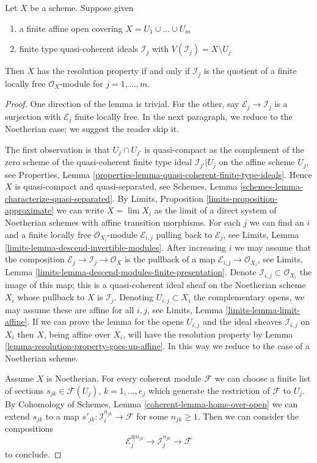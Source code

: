 \begin{lemma}
\label{lemma-resolution-property-finite-number}
Let $X$ be a scheme. Suppose given
\begin{enumerate}
\item a finite affine open covering $X = U_1 \cup \ldots \cup U_m$
\item finite type quasi-coherent ideals $\mathcal{I}_j$
with $V(\mathcal{I}_j) = X \setminus U_j$
\end{enumerate}
Then $X$ has the resolution property if and only if $\mathcal{I}_j$
is the quotient of a finite locally free $\mathcal{O}_X$-module
for $j = 1, \ldots, m$.
\end{lemma}

\begin{proof}
One direction of the lemma is trivial. For the other, 
say $\mathcal{E}_j \to \mathcal{I}_j$ is a surjection with
$\mathcal{E}_j$ finite locally free. In the next paragraph, we
reduce to the Noetherian case; we suggest the reader skip it.

\medskip\noindent
The first observation is that $U_j \cap U_{j'}$ is quasi-compact
as the complement of the zero scheme of the quasi-coherent finite type ideal
$\mathcal{I}_{j'}|{U_j}$ on the affine scheme $U_j$, see
Properties, Lemma \ref{properties-lemma-quasi-coherent-finite-type-ideals}.
Hence $X$ is quasi-compact and quasi-separated, see
Schemes, Lemma \ref{schemes-lemma-characterize-quasi-separated}.
By Limits, Proposition \ref{limits-proposition-approximate}
we can write $X = \lim X_i$ as the limit of a direct system of
Noetherian schemes with affine transition morphisms. For each $j$
we can find an $i$ and a finite locally free $\mathcal{O}_{X_i}$-module
$\mathcal{E}_{i, j}$ pulling back to $\mathcal{E}_j$, see
Limits, Lemma \ref{limits-lemma-descend-invertible-modules}.
After increasing $i$ we may assume that the composition
$\mathcal{E}_j \to \mathcal{I}_j \to \mathcal{O}_X$ is the
pullback of a map $\mathcal{E}_{i, j} \to \mathcal{O}_{X_i}$, see
Limits, Lemma \ref{limits-lemma-descend-modules-finite-presentation}.
Denote $\mathcal{I}_{i, j} \subset \mathcal{O}_{X_i}$ the image
of this map; this is a quasi-coherent ideal sheaf on the Noetherian
scheme $X_i$ whose pullback to $X$ is $\mathcal{I}_j$.
Denoting $U_{i, j} \subset X_i$ the complementary opens, we
may assume these are affine for all $i, j$, see
Limits, Lemma \ref{limits-lemma-limit-affine}.
If we can prove the lemma for the opens $U_{i, j}$ and the
ideal sheaves $\mathcal{I}_{i, j}$ on $X_i$ then $X$, being affine
over $X_i$, will have the resolution property by
Lemma \ref{lemma-resolution-property-goes-up-affine}.
In this way we reduce to the case of a Noetherian scheme.

\medskip\noindent
Assume $X$ is Noetherian. For every coherent module $\mathcal{F}$
we can choose a finite list of sections $s_{jk} \in \mathcal{F}(U_j)$,
$k = 1, \ldots, e_j$ which generate the restriction of $\mathcal{F}$ to $U_j$.
By Cohomology of Schemes, Lemma \ref{coherent-lemma-homs-over-open}
we can extend $s_{jk}$ to a map
$s'_{jk} : \mathcal{I}_i^{n_{jk}} \to \mathcal{F}$ for some $n_{jk} \geq 1$.
Then we can consider the compositions
$$
\mathcal{E}_j^{\otimes n_{jk}} \to \mathcal{I}_j^{n_{jk}} \to \mathcal{F}
$$
to conclude.
\end{proof}